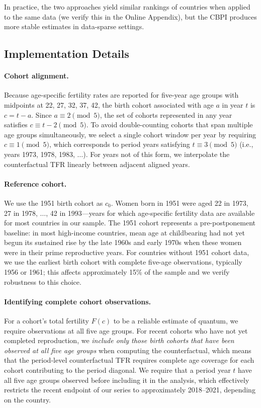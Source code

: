 \documentclass[12pt]{article}
\begin{document}
In practice, the two approaches yield similar rankings of countries
when applied to the same data (we verify this in the Online
Appendix), but the CBPI produces more stable estimates in data-sparse
settings.

\subsection{Implementation Details}

\paragraph{Cohort alignment.}
Because age-specific fertility rates are reported for five-year age
groups with midpoints at 22, 27, 32, 37, 42, the birth cohort
associated with age $a$ in year $t$ is $c = t - a$.  Since $a \equiv
2 \pmod{5}$, the set of cohorts represented in any year satisfies $c
\equiv t - 2 \pmod{5}$.  To avoid double-counting cohorts that span
multiple age groups simultaneously, we select a single cohort window
per year by requiring $c \equiv 1 \pmod{5}$, which corresponds to
period years satisfying $t \equiv 3 \pmod{5}$ (i.e., years 1973,
1978, 1983, $\ldots$).  For years not of this form, we interpolate
the counterfactual TFR linearly between adjacent aligned years.

\paragraph{Reference cohort.}
We use the 1951 birth cohort as $c_0$.  Women born in 1951 were aged
22 in 1973, 27 in 1978, $\ldots$, 42 in 1993---years for which
age-specific fertility data are available for most countries in our
sample.  The 1951 cohort represents a pre-postponement baseline: in
most high-income countries, mean age at childbearing had not yet begun
its sustained rise by the late 1960s and early 1970s when these women
were in their prime reproductive years.  For countries without 1951
cohort data, we use the earliest birth cohort with complete five-age
observations, typically 1956 or 1961; this affects approximately 15\%
of the sample and we verify robustness to this choice.

\paragraph{Identifying complete cohort observations.}
For a cohort's total fertility $F(c)$ to be a reliable estimate of
quantum, we require observations at all five age groups.  For recent
cohorts who have not yet completed reproduction, we \emph{include only
those birth cohorts that have been observed at all five age groups}
when computing the counterfactual, which means that the period-level
counterfactual TFR requires complete age coverage for each cohort
contributing to the period diagonal.  We require that a period year
$t$ have all five age groups observed before including it in the
analysis, which effectively restricts the recent endpoint of our
series to approximately 2018--2021, depending on the country.
\end{document}
